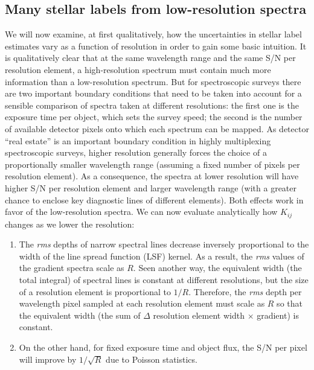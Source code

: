 \documentclass[iop]{emulateapj}
\begin{document}
\begin{CJK*}{UTF8}{gbsn}
%
%
%
%
%
%

\subsection{Many stellar labels from low-resolution spectra}
\label{sec:why-low-res}
We will now examine, at first qualitatively, how the uncertainties in stellar label estimates vary as a function of resolution in order to gain some basic intuition. It is qualitatively clear that at the same wavelength range and the same S/N per resolution element, a high-resolution spectrum must contain much more information than a low-resolution spectrum. But for spectroscopic surveys there are two important boundary conditions that need to be taken into account for a sensible comparison of spectra taken at different resolutions: the first one is the exposure time per object, which sets the survey speed; the second is the number of available detector pixels onto which each spectrum can be mapped. As detector ``real estate'' is an important boundary condition in highly multiplexing spectroscopic surveys, higher resolution generally forces the choice of a proportionally smaller wavelength range (assuming a fixed number of pixels per resolution element). As a consequence, the spectra at lower resolution will have higher S/N per resolution element and larger wavelength range (with a greater chance to enclose key diagnostic lines of different elements). Both effects work in favor of the low-resolution spectra. We can now evaluate analytically how $K_{ij}$ changes as we lower the resolution:

\begin{enumerate}
\item The {\it rms} depths of narrow spectral lines decrease inversely proportional to the width of the line spread function (LSF) kernel. As a result, the {\it rms} values of the gradient spectra scale as $R$. Seen another way, the equivalent width (the total integral) of spectral lines is constant at different resolutions, but the size of a resolution element is proportional to $1/R$. Therefore, the {\it rms} depth per wavelength pixel sampled at each resolution element must scale as $R$ so that the equivalent width (the sum of $\Delta$ resolution element width $\times$ gradient) is constant.

\item On the other hand, for fixed exposure time and object flux, the S/N per pixel will improve by $1/\sqrt{R}$ due to Poisson statistics.


\end{enumerate}
\end{CJK*}
\end{document}
